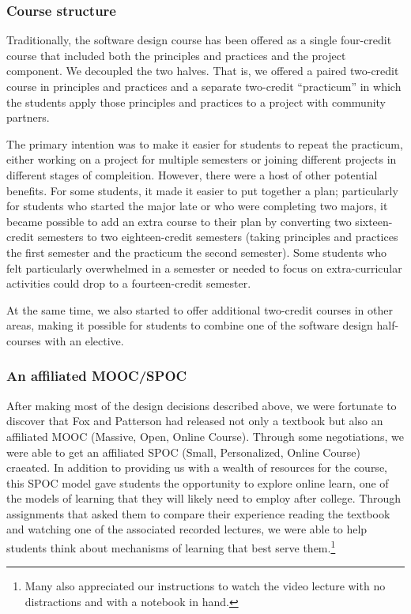 
\subsubsection{Course structure}

Traditionally, the software design course has been offered as a single
four-credit course that included both the principles and practices and
the project component.  We decoupled the two halves.  That is, we 
offered a paired two-credit course in principles and practices and
a separate two-credit ``practicum'' in which the students apply
those principles and practices to a project with community partners.

The primary intention was to make it easier for students to repeat
the practicum, either working on a project for multiple semesters
or joining different projects in different stages of compleition.
However, there were a host of other potential benefits.  For some
students, it made it easier to put together a plan; particularly
for students who started the major late or who were completing two
majors, it became possible to add an extra course to their plan by
converting two sixteen-credit semesters to two eighteen-credit
semesters (taking principles and practices the first semester and
the practicum the second semester).  Some students who felt particularly
overwhelmed in a semester or needed to focus on extra-curricular activities
could drop to a fourteen-credit semester.

At the same time, we also started to offer additional two-credit
courses in other areas, making it possible for students to combine
one of the software design half-courses with an elective.

\subsubsection{An affiliated MOOC/SPOC}

After making most of the design decisions described above, we were
fortunate to discover that Fox and Patterson had released not only
a textbook \cite{saasbook} but also an affiliated MOOC (Massive,
Open, Online Course).  Through some negotiations, we were able to
get an affiliated SPOC (Small, Personalized, Online Course) craeated.
In addition to providing us with a wealth of resources for the
course, this SPOC model gave students the opportunity to explore
online learn, one of the models of learning that they will likely
need to employ after college.  Through assignments that asked them
to compare their experience reading the textbook and watching one
of the associated recorded lectures, we were able to help students
think about mechanisms of learning that best serve them.\footnote{Many also
appreciated our instructions to watch the video lecture with no distractions
and with a notebook in hand.}

